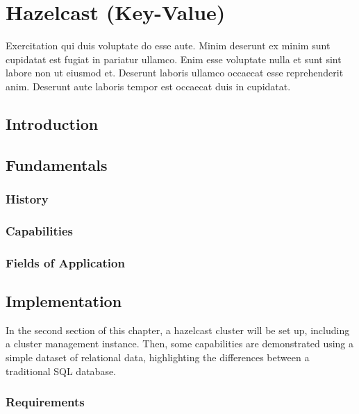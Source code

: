
\chapter{Hazelcast (Key-Value)} \label{ch:hazelcast}

Exercitation qui duis voluptate do esse aute. Minim deserunt ex minim sunt cupidatat est fugiat in pariatur ullamco. Enim esse voluptate nulla et sunt sint labore non ut eiusmod et. Deserunt laboris ullamco occaecat esse reprehenderit anim. Deserunt aute laboris tempor est occaecat duis in cupidatat.

\section{Introduction} \label{sec:introductionHazelcast}

\section{Fundamentals} \label{sec:fundamentalsHazelcast}
\subsection{History} \label{subsec:historyHazelcast}
\subsection{Capabilities} \label{subsec:capabilitiesHazelcast}
\subsection{Fields of Application} \label{subsec:fieldsOfApplicationHazelcast}

\section{Implementation} \label{sec:implementationHazelcast}

In the second section of this chapter, a hazelcast cluster will be set up, including a cluster management 
instance. Then, some capabilities are demonstrated using a simple dataset of relational data, highlighting 
the differences between a traditional SQL database.

\subsection{Requirements} \label{subsec:requirementsHazelcast}


